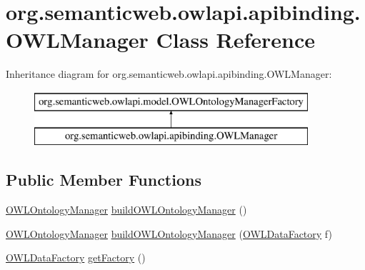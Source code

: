 \hypertarget{classorg_1_1semanticweb_1_1owlapi_1_1apibinding_1_1_o_w_l_manager}{\section{org.\-semanticweb.\-owlapi.\-apibinding.\-O\-W\-L\-Manager Class Reference}
\label{classorg_1_1semanticweb_1_1owlapi_1_1apibinding_1_1_o_w_l_manager}
}
Inheritance diagram for org.\-semanticweb.\-owlapi.\-apibinding.\-O\-W\-L\-Manager\-:\begin{figure}[H]
\begin{center}
\leavevmode
\includegraphics[height=2.000000cm]{classorg_1_1semanticweb_1_1owlapi_1_1apibinding_1_1_o_w_l_manager}
\end{center}
\end{figure}
\subsection*{Public Member Functions}
\begin{DoxyCompactItemize}
\item 
\hyperlink{interfaceorg_1_1semanticweb_1_1owlapi_1_1model_1_1_o_w_l_ontology_manager}{O\-W\-L\-Ontology\-Manager} \hyperlink{classorg_1_1semanticweb_1_1owlapi_1_1apibinding_1_1_o_w_l_manager_a680d70603feb2e74c7fbb86b0978fa33}{build\-O\-W\-L\-Ontology\-Manager} ()
\item 
\hyperlink{interfaceorg_1_1semanticweb_1_1owlapi_1_1model_1_1_o_w_l_ontology_manager}{O\-W\-L\-Ontology\-Manager} \hyperlink{classorg_1_1semanticweb_1_1owlapi_1_1apibinding_1_1_o_w_l_manager_aff0e8ae19f3a978d16e8bcb4f84b8882}{build\-O\-W\-L\-Ontology\-Manager} (\hyperlink{interfaceorg_1_1semanticweb_1_1owlapi_1_1model_1_1_o_w_l_data_factory}{O\-W\-L\-Data\-Factory} f)
\item 
\hyperlink{interfaceorg_1_1semanticweb_1_1owlapi_1_1model_1_1_o_w_l_data_factory}{O\-W\-L\-Data\-Factory} \hyperlink{classorg_1_1semanticweb_1_1owlapi_1_1apibinding_1_1_o_w_l_manager_a4975e012ebaf2b6b05130376d847d9e9}{get\-Factory} ()
\end{DoxyCompactItemize}
